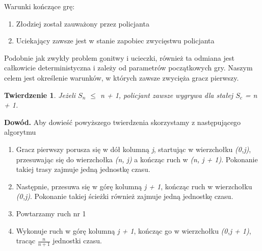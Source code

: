 \documentclass[brudnopis]{xmgr}
\newtheorem{Twierdzenie}{Twierdzenie}
\begin{document}
Warunki kończące grę:
\begin{enumerate}
  \item Złodziej został zauważony przez policjanta
  \item Uciekający zawsze jest w stanie zapobiec zwycięstwu policjanta
\end{enumerate}

Podobnie jak zwykły problem gonitwy i ucieczki, również ta odmiana jest całkowicie deterministyczna i zależy od parametrów początkowych gry. Naszym celem jest określenie warunków, w których zawsze zwycięża gracz pierwszy. 

\begin{Twierdzenie}
	Jeżeli $S_n$ $\le$ n + 1, policjant zawsze wygrywa dla stałej $S_c$ = n + 1.
\end{Twierdzenie}
\textbf{Dowód.} Aby dowieść powyższego twierdzenia skorzystamy z następującego algorytmu
\begin{enumerate}
	\item Gracz pierwszy porusza się w dół kolumną \textit{j}, startując w wierzchołku \textit{(0,j)}, przesuwając się do wierzchołka \textit{(n, j)} a kończąc ruch w \textit{(n, j + 1)}. Pokonanie takiej trasy zajmuje jedną jednostkę czasu.
	\item Następnie, przesuwa się w górę kolumną \textit{j + 1}, kończąc ruch w wierzchołku \textit{(0,j)}. Pokonanie takiej ścieżki również zajmuje jedną jednostkę czasu.
	\item Powtarzamy ruch nr 1
	\item Wykonuje ruch w górę kolumną \textit{j + 1}, kończąc go w wierzchołku \textit{(0,j + 1)}, tracąc $\frac{n}{n+1}$ jednostki czasu.
\end{enumerate}
\end{document}
